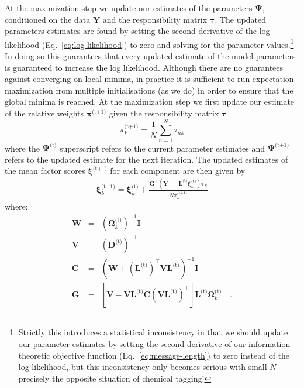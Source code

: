 \documentclass[twocolumn]{aastex62}
\newcommand{\vect}[1]{\boldsymbol{\mathbf{#1}}}
\renewcommand{\vec}[1]{\vect{#1}}
\newcommand{\weight}{\pi}
\newcommand{\data}{\textbf{Y}}
\newcommand{\vecdata}{\vec\data}
\newcommand{\nextstep}{^\textrm{(t+1)}}
\newcommand{\thisstep}{^\textrm{(t)}}
\newcommand{\transpose}{^\intercal}
\newcommand{\eye}{\textbf{I}}
\newcommand{\factorloads}{\textbf{L}}
\newcommand{\specificvariance}{\vec{D}}
\newcommand{\scoremeans}{\vec\xi}
\newcommand{\scorecovs}{\vec\Omega}
\newcommand{\NumData}{N}
\newcommand{\numdata}{n}
\newcommand{\numcomponents}{k}
\begin{document}
At the maximization step we update our estimates of the parameters $\vec\Psi$,
conditioned on the data $\vecdata$ and the responsibility matrix $\vec\tau$.
The updated parameters estimates are found by setting the second derivative
of the log likelihood (Eq.~\ref{eq:log-likelihood}) to zero and solving for
the parameter values.\footnote{Strictly this introduces a statistical inconsistency in that we should update our parameter estimates by setting the second derivative of our information-theoretic objective function (Eq.~\ref{eq:message-length}) to zero instead of the log likelihood, but this inconsistency only becomes serious with small $N$ -- precisely the opposite situation of chemical tagging!}
In doing so this guarantees that every updated
estimate of the model parameters is guaranteed to increase the log likelihood.
Although there are no guarantees against converging on local minima, in 
practice it is sufficient to run expectation-maximization from multiple
initialisations (as we do) in order to ensure that the global minima is reached.
At the maximization step we first update our estimate of the relative weights 
$\vec\weight\nextstep$ given the responsibility matrix $\vec\tau$
\begin{equation}
	\weight_\numcomponents\nextstep = \frac{1}{\NumData} \sum_{\numdata=1}^{\NumData}\tau_{\numdata\numcomponents}
\end{equation}
\noindent{}where the $\vec{\Psi}\thisstep$ superscript refers to the current parameter estimates and $\vec{\Psi}\nextstep$ refers to the updated estimate for the next iteration.
The updated estimates of the mean factor scores 
$\scoremeans\nextstep$ for each component are then given by
\begin{eqnarray}
	\scoremeans_\numcomponents\nextstep = \scoremeans_\numcomponents\thisstep + \frac{\vec{G}\transpose(\vecdata\transpose - \factorloads\thisstep\scoremeans_\numcomponents\thisstep)\vec\tau_\numcomponents}{\NumData\weight_\numcomponents\nextstep}
\end{eqnarray}
\noindent{}where:
\begin{eqnarray}
	\vec{W} &=& (\scorecovs_\numcomponents\thisstep)^{-1}\eye \\
	\vec{V} &=& \left(\specificvariance\thisstep\right)^{-1} \\
	\vec{C} &=& (\vec{W} + (\factorloads\thisstep)\transpose\vec{V}\factorloads\thisstep)^{-1}\eye \\
	\vec{G} &=& \left[\vec{V} - \vec{V}\factorloads\thisstep\vec{C}\left(\vec{V}\factorloads\thisstep\right)\transpose\right]\factorloads\thisstep\scorecovs_k\thisstep \quad .
\end{eqnarray}
\end{document}
